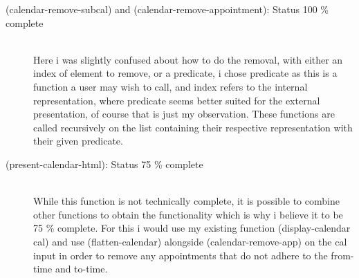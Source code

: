 \documentclass[11pt,a4paper,article,oneside]{memoir}
\begin{document}
\begin{description}
    \item [(calendar-remove-subcal) and (calendar-remove-appointment): Status 100 \% complete] \hfill\\
    Here i was slightly confused about how to do the removal, with either an index of element to remove, or a predicate, i chose predicate as this is a function a user may wish to call, and index refers to the internal representation, where predicate seems better suited for the external presentation, of course that is just my observation.
    These functions are called recursively on the list containing their respective representation with their given predicate.  
    \item [(present-calendar-html): Status 75 \% complete] \hfill \\
    While this function is not technically complete, it is possible to combine other functions to obtain the functionality which is why i believe it to be 75 \% complete.
    For this i would use my existing function (display-calendar cal) and use (flatten-calendar) alongside (calendar-remove-app) on the cal input in order to remove any appointments that do not adhere to the from-time and to-time.
\end{description}
\end{document}
